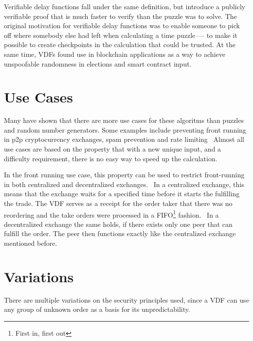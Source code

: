 Verifiable delay functions fall under the same definition, but introduce a publicly verifiable proof that is much faster to verify than the puzzle was to solve. The original motivation for verifiable delay functions was to enable someone to pick off where somebody else had left when calculating a time puzzle --- to make it possible to create checkpoints in the calculation that could be trusted. At the same time, VDFs found use in blockchain applications as a way to achieve unspoofable randomness in elections and smart contract input.

\section{Use Cases}
Many have shown that there are more use cases for these algoritms than puzzles and random number generators. Some examples include preventing front running in p2p cryptocurrency exchanges, spam prevention and rate limiting~\cite{noauthor_undated-hk} Almost all use cases are based on the property that with a new unique input, and a difficulty requirement, there is no easy way to speed up the calculation.

In the front running use case, this property can be used to restrict front-running in both centralized and decentralized exchanges.~\cite{Khalil2019-sl} In a centralized exchange, this means that the exchange waits for a specified time before it starts the fulfilling the trade. The VDF serves as a receipt for the order taker that there was no reordering and the take orders were processed in a FIFO\footnote{First in, first out} fashion.~\cite{Cline2020-wb} In a decentralized exchange the same holds, if there exists only one peer that can fulfill the order. The peer then functions exactly like the centralized exchange mentioned before.

\section{Variations}
There are multiple variations on the security principles used, since a VDF can use any group of unknown order as a basis for its unpredictability.


